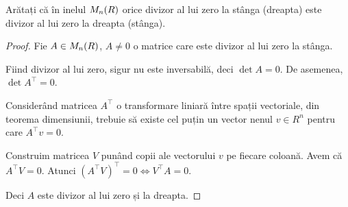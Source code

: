 \begin{exercise}[1.11]
Arătați că în inelul \(M_{n}({R})\) orice divizor al lui zero la stânga (dreapta) este divizor al lui zero la dreapta (stânga).
\end{exercise}
\begin{proof}
Fie \(A \in M_{n}({R})\), \(A \neq 0\) o matrice care este divizor al lui zero la stânga. 

Fiind divizor al lui zero, sigur nu este inversabilă, deci \(\det A = 0\). De asemenea, \(\det A^\intercal = 0\).

Considerând matricea \(A^\intercal\) o transformare liniară între spații vectoriale, din teorema dimensiunii, trebuie să existe cel puțin un vector nenul \(v \in R^n\) pentru care \(A^\intercal v = 0\).

Construim matricea \(V\) punând copii ale vectorului \(v\) pe fiecare coloană. Avem că \(A^\intercal V = 0\). Atunci \((A^\intercal V)^\intercal = 0 \iff V^\intercal A = 0\).

Deci \(A\) este divizor al lui zero și la dreapta.
\end{proof}


